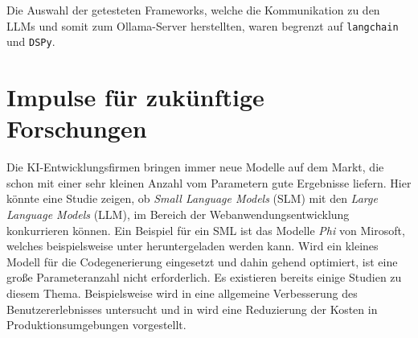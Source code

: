 Die Auswahl der getesteten Frameworks, welche die Kommunikation zu den LLMs und somit zum Ollama-Server herstellten, waren begrenzt auf \texttt{langchain} und \texttt{DSPy}.\vspace{0.2cm}

\section{Impulse für zukünftige Forschungen}

Die KI-Entwicklungsfirmen bringen immer neue Modelle auf dem Markt, die schon mit einer sehr kleinen Anzahl vom Parametern gute Ergebnisse liefern. Hier könnte eine Studie zeigen, ob \textit{Small Language Models} (SLM) mit den \textit{Large Language Models} (LLM), im Bereich der Webanwendungsentwicklung konkurrieren können. Ein Beispiel für ein SML ist das Modelle \textit{Phi} von Mirosoft, welches beispielsweise unter \cite{phi2_huggingface_2024} heruntergeladen werden kann. Wird ein kleines Modell für die Codegenerierung eingesetzt und dahin gehend optimiert, ist eine große Parameteranzahl nicht erforderlich. Es existieren bereits einige Studien zu diesem Thema. Beispielsweise wird in \cite{hu-2024} eine allgemeine Verbesserung des Benutzererlebnisses untersucht und in \cite{irugalbandara-2023} wird eine Reduzierung der Kosten in Produktionsumgebungen vorgestellt.\vspace{0.2cm}

